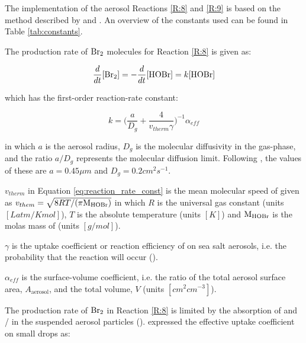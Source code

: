 The implementation of the aerosol Reactions \ref{R:8} and \ref{R:9} is based on the method described by \cite{CAO} and \cite{schwartz1986}. An overview of the constants used can be found in Table \ref{tab:constants}.

\medskip

The production rate of $\mathrm{Br_2}$ molecules for Reaction \ref{R:8} is given as: 

\begin{equation*}
    \frac{d}{dt}[\mathrm{Br_2}] = -\frac{d}{dt}[\mathrm{HOBr}] = k[\mathrm{HOBr}]
\end{equation*}

which has the first-order reaction-rate constant: 

\begin{equation*}
    k = \big(\frac{a}{D_g} + \frac{4}{v_{therm}\gamma}\big)^{-1}\alpha_{eff}
    \label{eq:reaction_rate_const}
\end{equation*}

in which $a$ is the aerosol radius, $D_g$ is the molecular diffusivity in the gas-phase, and the ratio $a/D_g$ represents the molecular diffusion limit. Following \cite{CAO}, the values of these are $a = 0.45 \mu m$ and $D_g = 0.2 cm^2s^{-1}$. 

\medskip

$v_{therm}$ in Equation \ref{eq:reaction_rate_const} is the mean molecular speed of  given as $v_{them} = \sqrt{8RT/(\pi \mathrm{M_{HOBr}})}$ in which $R$ is the universal gas constant (units $[Latm/Kmol]$), $T$ is the absolute temperature (units $[K]$) and $\mathrm{M_{HOBr}}$ is the molas mass of  (units $[g/mol]$). 

\medskip

$\gamma$ is the uptake coefficient or reaction efficiency of  on sea salt aerosols, i.e. the probability that the reaction will occur (\cite{SeinfeldSpyros}).

\medskip

$\alpha_{eff}$ is the surface-volume coefficient, i.e. the ratio of the total aerosol surface area, $A_{\text{aerosol}}$, and the total volume, $V$ (units $[cm^2cm^{-3}]$).
 
\medskip

The production rate of $\mathrm{Br_2}$ in Reaction \ref{R:8} is limited by the absorption of  and / in the suspended aerosol particles (\cite{CAO}). \cite{Hanson1994} expressed the effective uptake coefficient on small drops as: 


